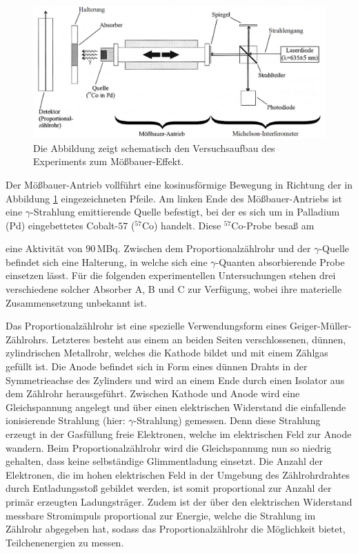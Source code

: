 \documentclass[
a4paper,                %
titlepage=firstiscover, %
captions=tableheading,  %
toc=bibliography,       %
toc=listof,             %
oneside,                %
automark,               %
12pt,                   %
english, ngerman,       %
parskip = half,         %
]{scrartcl}
\begin{document}
\begin{figure}[H]
	\centering
	\includegraphics[width=1.0\textwidth]{img/VersuchsaufbauMoessbauer}
	\caption{Die Abbildung zeigt schematisch den Versuchsaufbau des Experiments zum Mößbauer-Effekt.\cite{4}}
	\label{Versuchsaufbau}
\end{figure}

\noindent Der Mößbauer-Antrieb vollführt eine kosinusförmige Bewegung in Richtung der in Abbildung \ref{Versuchsaufbau} eingezeichneten Pfeile.
Am linken Ende des Mößbauer-Antriebs ist eine $\gamma$-Strahlung emittierende Quelle befestigt, bei der es sich um in Palladium (Pd) eingebettetes Cobalt-$57$ ($^{57}$Co) handelt.
Diese $^{57}$Co-Probe besaß am \date{27.01.2015} eine Aktivität von $90\,$MBq.
Zwischen dem Proportionalzählrohr und der $\gamma$-Quelle befindet sich eine Halterung, in welche sich eine $\gamma$-Quanten absorbierende Probe einsetzen lässt.
Für die folgenden experimentellen Untersuchungen stehen drei verschiedene solcher Absorber A, B und C zur Verfügung, wobei ihre materielle Zusammensetzung unbekannt ist.

Das Proportionalzählrohr ist eine spezielle Verwendungsform eines Geiger-Müller-Zählrohrs.
Letzteres besteht aus einem an beiden Seiten verschlossenen, dünnen, zylindrischen Metallrohr, welches die Kathode bildet und mit einem Zählgas gefüllt ist.
Die Anode befindet sich in Form eines dünnen Drahts in der Symmetrieachse des Zylinders und wird an einem Ende durch einen Isolator aus dem Zählrohr herausgeführt.
Zwischen Kathode und Anode wird eine Gleichspannung angelegt und über einen elektrischen Widerstand die einfallende ionisierende Strahlung (hier: $\gamma$-Strahlung) gemessen.
Denn diese Strahlung erzeugt in der Gasfüllung freie Elektronen, welche im elektrischen Feld zur Anode wandern.
Beim Proportionalzählrohr wird die Gleichspannung nun so niedrig gehalten, dass keine selbständige Glimmentladung einsetzt.
Die Anzahl der Elektronen, die im hohen elektrischen Feld in der Umgebung des Zählrohrdrahtes durch Entladungsstoß gebildet werden, ist somit proportional zur Anzahl der primär erzeugten Ladungsträger.
Zudem ist der über den elektrischen Widerstand messbare Stromimpuls proportional zur Energie, welche die Strahlung im Zählrohr abgegeben hat, sodass das Proportionalzählrohr die Möglichkeit bietet, Teilchenenergien zu messen.
\end{document}
